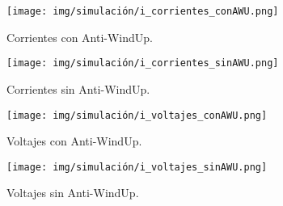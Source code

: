 \begin{figure}[H]
    \centering
    \texttt{[image: img/simulación/i\_corrientes\_conAWU.png]}
    \caption{Corrientes con Anti-WindUp.}
    \label{fig:i_corrientes_conAWU}
\end{figure}

\begin{figure}[H]
    \centering
    \texttt{[image: img/simulación/i\_corrientes\_sinAWU.png]}
    \caption{Corrientes sin Anti-WindUp.}
    \label{fig:i_corrientes_sinAWU}
\end{figure}

\begin{figure}[H]
    \centering
    \texttt{[image: img/simulación/i\_voltajes\_conAWU.png]}
    \caption{Voltajes con Anti-WindUp.}
    \label{fig:i_voltajes_conAWU}
\end{figure}

\begin{figure}[H]
    \centering
    \texttt{[image: img/simulación/i\_voltajes\_sinAWU.png]}
    \caption{Voltajes sin Anti-WindUp.}
    \label{fig:i_voltajes_sinAWU}
\end{figure}

\newpage